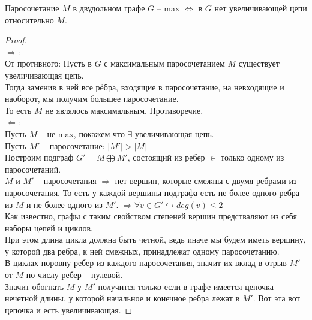 \begin{theorem}
	Паросочетание $M$ в двудольном графе  $G$ -- max $\iff $ в $G$ нет увеличивающей цепи относительно $M$.
\end{theorem}

\begin{proof} \ \\
	 $\Rightarrow$: \\
		От противного: Пусть в $G$ с максимальным паросочетанием $M$ существует увеличивающая цепь. \\
		Тогда заменив в ней все рёбра, входящие в паросочетание, на невходящие и наоборот, мы получим большее паросочетание.\\
		То есть $M$ не являлось максимальным. Противоречие.\\
	$\Leftarrow$: \\
	 	Пусть $M$ -- не max, покажем что $\exists$ увеличивающая цепь.\\
		Пусть $M'$ -- паросочетание: $\lvert M' \rvert > \lvert M \rvert $\\
		Построим подграф  $G' = M \bigoplus M'$, состоящий из ребер $\in$ только одному из паросочетаний.\\
		$M$ и  $M'$ -- паросочетания  $\Rightarrow$ нет вершин, которые смежны с двумя ребрами из паросочетания. То есть у каждой вершины подграфа есть не более одного ребра из $M$ и не более одного из  $M'$.  $\Rightarrow \forall v \in G' \hookrightarrow deg(v) \leq 2$\\
		Как известно, графы с таким свойством степеней вершин предстваляют из себя наборы цепей и циклов. \\
		При этом длина цикла должна быть четной, ведь иначе мы будем иметь вершину, у которой два ребра, к ней смежных, принадлежат одному паросочетанию.\\
		В циклах поровну ребер из каждого паросочетания, значит их вклад в отрыв $M'$ от $M$ по числу ребер -- нулевой.\\
		Значит обогнать $M$ у  $M'$ получится только если в графе имеется цепочка нечетной длины, у которой начальное и конечное ребра лежат в $M'$. Вот эта вот цепочка и есть увеличивающая.
\end{proof}

